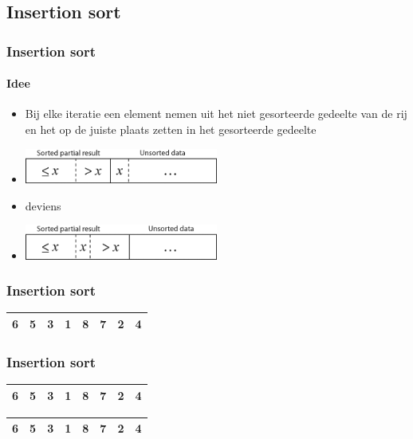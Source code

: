 \subsection[Insertion]{Insertion sort}

\begin{frame}
\frametitle{Insertion sort}
\framesubtitle{Idee}
\begin{itemize}
\item Bij elke iteratie een element nemen uit het niet gesorteerde gedeelte van de rij en het op de juiste plaats zetten in het gesorteerde gedeelte
\item \includegraphics[width=0.5\textwidth]{./1-sorting/img/insertion_before}
\item deviens
\item \includegraphics[width=0.5\textwidth]{./1-sorting/img/insertion_after}
\end{itemize}
\end{frame}

\begin{frame}
\frametitle{Insertion sort}
\begin{table}
\begin{tabular}{| c | c | c | c | c | c | c | c |}
\hline
6 & 5 & 3 & 1 & 8 & 7 & 2 & 4 \\ 
\hline
\end{tabular}
\end{table}
\end{frame}

\begin{frame}
\frametitle{Insertion sort}
\begin{table}
\begin{tabular}{| c | c | c | c | c | c | c | c |}
\hline
\cellcolor{red!25}6 & 5 & 3 & 1 & 8 & 7 & 2 & 4 \\ 
\hline
\end{tabular}
\end{table}
\begin{table}
\begin{tabular}{| c | c | c | c | c | c | c | c |}
\hline
\cellcolor{blue!25}6 & 5 & 3 & 1 & 8 & 7 & 2 & 4 \\ 
\hline
\end{tabular}
\end{table}
\end{frame}

